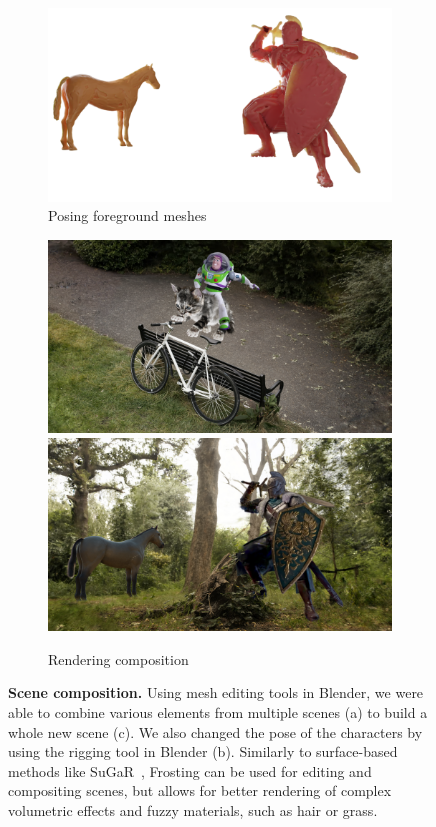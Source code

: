 \begin{figure}[ht]
\begin{subfigure}{0.42\linewidth}
 \includegraphics[width=\linewidth]{images/composition/knight_and_horse/mesh.png}
  \caption{Posing foreground meshes}
  \end{subfigure}
  \hfill
  \begin{subfigure}{0.42\linewidth}
 \includegraphics[width=\linewidth]{images/composition/buzz_riding_cat/0_0.png}
 \includegraphics[width=\linewidth]{images/composition/knight_and_horse/0_1.png}
  \caption{Rendering composition}
  \end{subfigure}
  \caption{
  \textbf{Scene composition.} Using mesh editing tools in Blender, we were able to combine various elements from multiple scenes (a) to build a whole new scene (c). We also changed the pose of the characters by using the rigging tool in Blender (b). Similarly to surface-based methods like SuGaR~\cite{guedon2023sugar}, Frosting can be used for editing and compositing scenes, but allows for better rendering of complex volumetric effects and fuzzy materials, such as hair or grass.
  }
  \label{fig:scene-composition}
\end{figure}